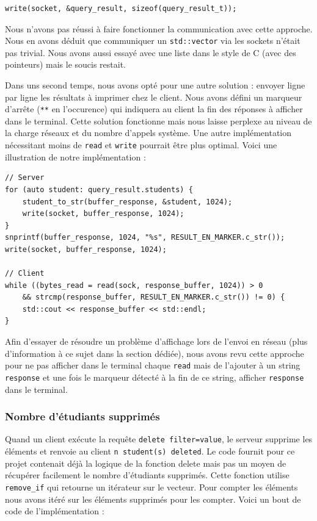 \documentclass[utf8]{article}
\begin{document}
\begin{lstlisting}
write(socket, &query_result, sizeof(query_result_t));
\end{lstlisting}
	
	Nous n'avons pas réussi à faire fonctionner la communication avec cette approche. Nous en avons déduit que communiquer un \texttt{std::vector} via les sockets n'était pas trivial. Nous avons aussi essayé avec une liste dans le style de C (avec des pointeurs) mais le soucis restait.
	
	Dans uns second temps, nous avons opté pour une autre solution : envoyer ligne par ligne les résultats à imprimer chez le client. Nous avons défini un marqueur d'arrête (\texttt{**} en l'occurence) qui indiquera au client la fin des réponses à afficher dans le terminal. Cette solution fonctionne mais nous laisse perplexe au niveau de la charge réseaux et du nombre d'appels système. Une autre implémentation nécessitant moins de \texttt{read} et \texttt{write} pourrait être plus optimal. Voici une illustration de notre implémentation :

\begin{lstlisting}
// Server
for (auto student: query_result.students) {
	student_to_str(buffer_response, &student, 1024);
	write(socket, buffer_response, 1024);
}
snprintf(buffer_response, 1024, "%s", RESULT_EN_MARKER.c_str());
write(socket, buffer_response, 1024);

// Client 
while ((bytes_read = read(sock, response_buffer, 1024)) > 0
	&& strcmp(response_buffer, RESULT_EN_MARKER.c_str()) != 0) {
	std::cout << response_buffer << std::endl;
}
\end{lstlisting}

Afin d'essayer de résoudre un problème d'affichage lors de l'envoi en réseau (plus d'information à ce sujet dans la section dédiée), nous avons revu cette approche pour ne pas afficher dans le terminal chaque \texttt{read} mais de l'ajouter à un string \texttt{response} et une fois le marqueur détecté à la fin de ce string, afficher \texttt{response} dans le terminal.

\subsubsection{Nombre d'étudiants supprimés}

Quand un client exécute la requête \texttt{delete filter=value}, le serveur supprime les éléments et renvoie au client \texttt{n student(s) deleted}. Le code fournit pour ce projet contenait déjà la logique de la fonction delete mais pas un moyen de récupérer facilement le nombre d'étudiants supprimés. Cette fonction utilise \texttt{remove\_if} qui retourne un itérateur sur le vecteur. Pour compter les éléments nous avons itéré sur les éléments supprimés pour les compter. Voici un bout de code de l'implémentation :
\end{document}
